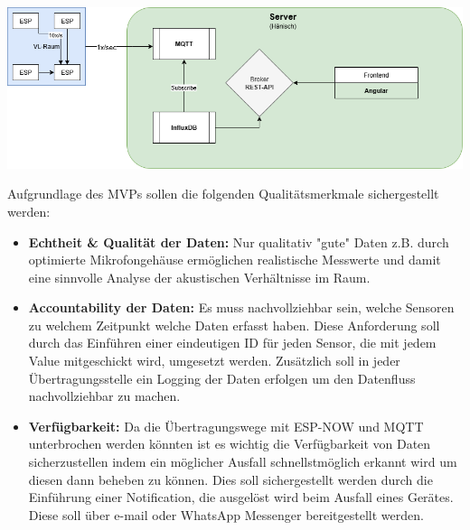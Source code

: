 \begin{center}
  \includegraphics[width=1\textwidth]{../images/MVP/MVPVisualisierung.png}
\end{center}

Aufgrundlage des MVPs sollen die folgenden Qualitätsmerkmale sichergestellt werden:
\begin{itemize}
    \item \textbf{Echtheit \& Qualität der Daten:}
    Nur qualitativ "gute" Daten z.B. durch optimierte Mikrofongehäuse ermöglichen realistische Messwerte und damit eine sinnvolle Analyse der akustischen Verhältnisse im Raum.
\item \textbf{Accountability der Daten:}
    Es muss nachvollziehbar sein, welche Sensoren zu welchem Zeitpunkt welche Daten erfasst haben. Diese Anforderung soll durch das Einführen einer eindeutigen ID für jeden Sensor, die mit jedem Value mitgeschickt wird, umgesetzt werden. Zusätzlich soll in jeder Übertragungsstelle ein Logging der Daten erfolgen um den Datenfluss nachvollziehbar zu machen.
    \item \textbf{Verfügbarkeit:}
    Da die Übertragungswege mit ESP-NOW und MQTT unterbrochen werden könnten ist es wichtig die Verfügbarkeit von Daten sicherzustellen indem ein möglicher Ausfall schnellstmöglich erkannt wird um diesen dann beheben zu können. Dies soll sichergestellt werden durch die Einführung einer Notification, die ausgelöst wird beim Ausfall eines Gerätes. Diese soll über e-mail oder WhatsApp Messenger bereitgestellt werden.
\end{itemize}
